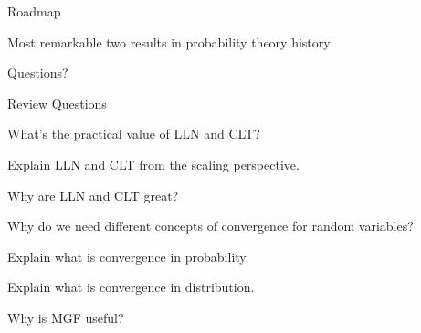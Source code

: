 \documentclass[fleqn,aspectratio=169]{beamer}
\begin{document}
\begin{frame}{Roadmap}

\plitemsep 0.1in

\bci 
\item Most remarkable two results in probability theory history

\bigskip

\item {}
\item {}
\item {}

\item {}

\item {}
\eci 

\end{frame}


\begin{frame}{}
\vspace{2cm}
\LARGE Questions?

\end{frame}

\begin{frame}{Review Questions}

\bce[1)]
\item What's the practical value of LLN and CLT?

\item Explain LLN and CLT from the scaling perspective.

\item Why are LLN and CLT great?

\item Why do we need different concepts of convergence for random variables?

\item Explain what is convergence in probability.

\item Explain what is convergence in distribution. 

\item Why is MGF useful?

\ece

\end{frame}
\end{document}
